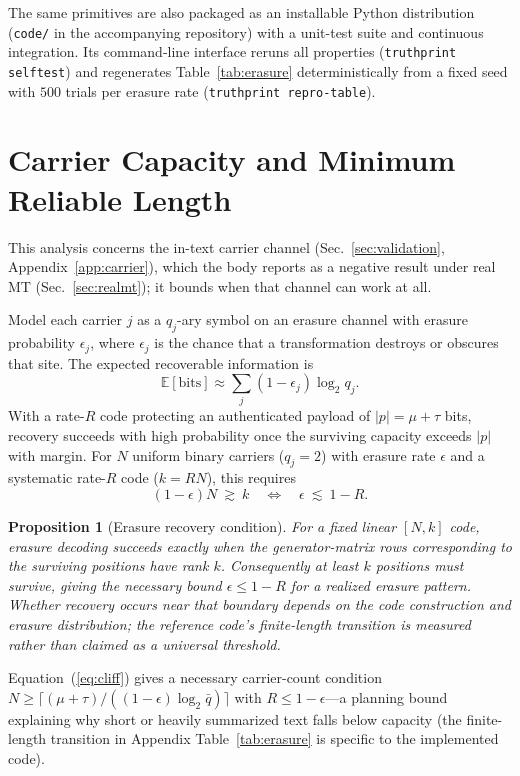 \documentclass[11pt]{article}
\newtheorem{proposition}{Proposition}
\begin{document}
The same primitives are also packaged as an installable Python distribution (\texttt{code/} in the accompanying repository) with a unit-test suite and continuous integration. Its command-line interface reruns all properties (\texttt{truthprint selftest}) and regenerates Table~\ref{tab:erasure} deterministically from a fixed seed with $500$ trials per erasure rate (\texttt{truthprint repro-table}).

\section{Carrier Capacity and Minimum Reliable Length}
\label{app:capacity}
This analysis concerns the in-text carrier channel (Sec.~\ref{sec:validation}, Appendix~\ref{app:carrier}), which the body reports as a negative result under real MT (Sec.~\ref{sec:realmt}); it bounds when that channel can work at all.

Model each carrier $j$ as a $q_j$-ary symbol on an erasure channel with erasure probability $\epsilon_j$, where $\epsilon_j$ is the chance that a transformation destroys or obscures that site. The expected recoverable information is
\begin{equation}
\mathbb{E}[\text{bits}]\approx\sum_j (1-\epsilon_j)\log_2 q_j .
\end{equation}
With a rate-$R$ code protecting an authenticated payload of $|p|=\mu+\tau$ bits, recovery succeeds with high probability once the surviving capacity exceeds $|p|$ with margin. For $N$ uniform binary carriers ($q_j=2$) with erasure rate $\epsilon$ and a systematic rate-$R$ code ($k=RN$), this requires
\begin{equation}
(1-\epsilon)N \ \gtrsim\ k \quad\Longleftrightarrow\quad \epsilon \ \lesssim\ 1-R .
\label{eq:cliff}
\end{equation}
\begin{proposition}[Erasure recovery condition]
\label{prop:cliff}
For a fixed linear $[N,k]$ code, erasure decoding succeeds exactly when the
generator-matrix rows corresponding to the surviving positions have rank $k$.
Consequently at least $k$ positions must survive, giving the necessary bound
$\epsilon\leq 1-R$ for a realized erasure pattern.  Whether recovery occurs
near that boundary depends on the code construction and erasure distribution;
the reference code's finite-length transition is measured rather than claimed
as a universal threshold.
\end{proposition}
Equation~(\ref{eq:cliff}) gives a necessary carrier-count condition $N\geq\lceil(\mu+\tau)/((1-\epsilon)\log_2\bar q)\rceil$ with $R\leq1-\epsilon$---a planning bound explaining why short or heavily summarized text falls below capacity (the finite-length transition in Appendix Table~\ref{tab:erasure} is specific to the implemented code).
\end{document}

